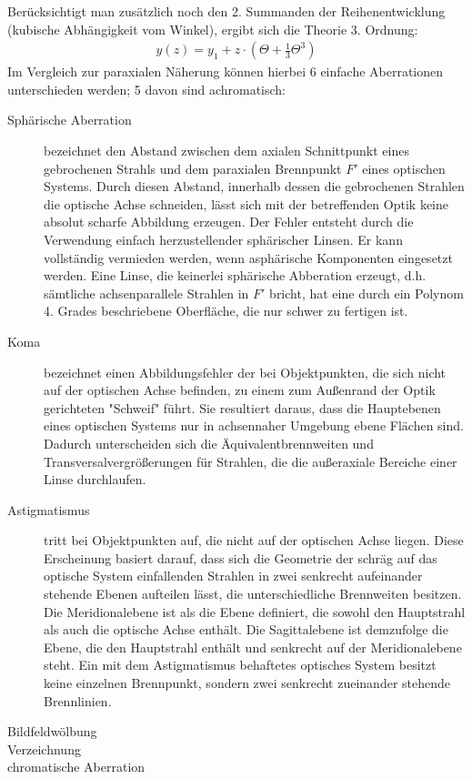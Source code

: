 Berücksichtigt man zusätzlich noch den 2. Summanden der Reihenentwicklung (kubische Abhängigkeit vom Winkel), ergibt sich die Theorie 3. Ordnung:
\begin{align*}
y(z)=y_1 + z \cdot \left( \Theta + \frac{1}{3}\Theta^3\right) 
\end{align*}
Im Vergleich zur paraxialen Näherung können hierbei 6 einfache Aberrationen unterschieden werden; 5 davon sind achromatisch:
\begin{description}
	\item[Sphärische Aberration] bezeichnet den Abstand zwischen dem axialen Schnittpunkt eines gebrochenen Strahls und dem paraxialen Brennpunkt $F'$ eines optischen Systems. Durch diesen Abstand, innerhalb dessen die gebrochenen Strahlen die optische Achse schneiden, lässt sich mit der betreffenden Optik keine absolut scharfe Abbildung erzeugen. \cite[416ff.]{hecht2014optik} Der Fehler entsteht durch die Verwendung einfach herzustellender sphärischer Linsen. Er kann vollständig vermieden werden, wenn asphärische Komponenten eingesetzt werden. Eine Linse, die keinerlei sphärische Abberation erzeugt, d.h. sämtliche achsenparallele Strahlen in $F'$ bricht, hat eine durch ein Polynom 4. Grades beschriebene Oberfläche, die nur schwer zu fertigen ist. \cite[Vol. 1, 27-2ff.]{feynman2011flp}
	\item[Koma] bezeichnet einen Abbildungsfehler der bei Objektpunkten, die sich nicht auf der optischen Achse befinden, zu einem zum Außenrand der Optik gerichteten "Schweif" führt. Sie resultiert daraus, dass die Hauptebenen eines optischen Systems nur in achsennaher Umgebung ebene Flächen sind. Dadurch unterscheiden sich die Äquivalentbrennweiten und Transversalvergrößerungen für Strahlen, die die außeraxiale Bereiche einer Linse durchlaufen. \cite[423ff.]{hecht2014optik}
	\item[Astigmatismus] tritt bei Objektpunkten auf, die nicht auf der optischen Achse liegen. Diese Erscheinung basiert darauf, dass sich die Geometrie der schräg auf das optische System einfallenden Strahlen in zwei senkrecht aufeinander stehende Ebenen aufteilen lässt, die unterschiedliche Brennweiten besitzen. Die Meridionalebene ist als die Ebene definiert, die sowohl den Hauptstrahl als auch die optische Achse enthält. Die Sagittalebene ist demzufolge die Ebene, die den Hauptstrahl enthält und senkrecht auf der Meridionalebene steht. Ein mit dem Astigmatismus behaftetes optisches System besitzt keine einzelnen Brennpunkt, sondern zwei senkrecht zueinander stehende Brennlinien. \cite[428ff.]{hecht2014optik}
	\item[Bildfeldwölbung]
	\item[Verzeichnung]
	\item[chromatische Aberration]
\end{description}